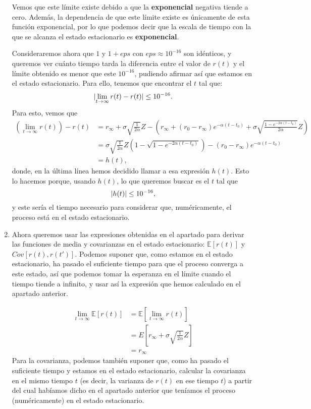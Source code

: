 \documentclass[a4paper]{article}
\DeclarePairedDelimiter\abs{\lvert}{\rvert}%
\begin{document}
\begin{enumerate}[label=(\alph*)]
        Vemos que este límite existe debido a que la \textbf{exponencial} negativa tiende a cero. Además, la dependencia de que este límite existe es únicamente de esta función exponencial, por lo que podemos decir que la escala de tiempo con la que se alcanza el estado estacionario es \textbf{exponencial}.



        Consideraremos ahora que $1$ y $1+eps$ con $eps \approx 10^{-16}$ son idénticos, y queremos ver cuánto tiempo tarda la diferencia entre el valor de $r(t)$ y el límite obtenido es menor que este $10^{-16}$, pudiendo afirmar así que estamos en el estado estacionario. Para ello, tenemos que encontrar el $t$ tal que:
        \[
        \abs{\lim_{t\to \infty}r(t) - r(t)} \leq 10^{-16}.
        \]
        Para esto, vemos que
        \begin{align*}
          \left(\lim_{t\to \infty}r(t)\right) - r(t) & = r_{\infty}  + \sigma \sqrt{\frac{1}{2\alpha}}Z - \left( r_{\infty} + (r_{0} - r_{\infty})e^{-\alpha(t-t_{0})} + \sigma \sqrt{\frac{1 - e^{-2\alpha(t-t_{0})}}{2\alpha}}Z \right)\\
                                                     & = \sigma \sqrt{\frac{1}{2\alpha}}Z\left(1 - \sqrt{1 - e^{-2\alpha(t-t_{0})}}\right) - (r_{0} - r_{\infty})e^{-\alpha(t-t_{0})}\\
          & = h(t),
        \end{align*}
        donde, en la última línea hemos decidido llamar a esa expresión $h(t)$. Esto lo hacemos porque, usando $h(t)$, lo que queremos buscar es el $t$ tal que
        \[
        \abs{h(t)} \leq 10^{-16},
        \]
        y este sería el tiempo necesario para considerar que, numéricamente, el proceso está en el estado estacionario.

  \item  Ahora queremos usar las expresiones obtenidas en el apartado \label{2:a} para derivar las funciones de media y covarianzas en el estado estacionario: $\mathbb E[r(t)]$ y $Cov[r(t), r(t')]$. Podemos suponer que, como estamos en el estado estacionario, ha pasado el suficiente tiempo para que el proceso converga a este estado, así que podemos tomar la esperanza en el límite cuando el tiempo tiende a infinito, y usar así la expresión que hemos calculado en el apartado anterior.

        \begin{align*}
          \lim_{t\to \infty} \mathbb E [r(t)] & = \mathbb E \left[ \lim_{t \to \infty} r(t)\right] \\
                                              & = E \left[r_{\infty}  + \sigma \sqrt{\frac{1}{2\alpha}}Z\right]\\
          & = r_{\infty}
        \end{align*}
        Para la covarianza, podemos también suponer que, como ha pasado el suficiente tiempo y estamos en el estado estacionario, calcular la covarianza en el mismo tiempo $t$ (es decir, la varianza de $r(t)$ en ese tiempo $t$) a partir del cual habíamos dicho en el apartado anterior que teníamos el proceso (numéricamente) en el estado estacionario.


\end{enumerate}
\end{document}
